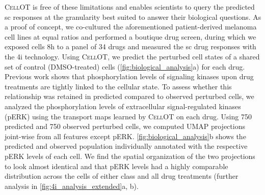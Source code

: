 \textsc{CellOT} is free of these limitations and enables scientists to query the predicted \acrlong{sc} responses at the granularity best suited to answer their biological questions. As a proof of concept, we co-cultured the aforementioned patient-derived melanoma cell lines at equal ratios and performed a boutique drug screen, during which we exposed cells 8h to a panel of 34 drugs and measured the \acrlong{sc} drug responses with the \acrshort{4i} technology. 
Using \textsc{CellOT}, 
we predict the perturbed cell states of a shared set of control (DMSO-treated) cells (\cref{fig:biological_analysis}a) for each drug.
Previous work \citep{kramer2019cellular} shows that phosphorylation levels of signaling kinases upon drug treatments are tightly linked to the cellular state. 
To assess whether this relationship was retained in predicted compared to observed perturbed cells, we analyzed the phosphorylation levels of extracellular signal-regulated kinases (pERK) using the transport maps learned by \textsc{CellOT} on each drug.
Using 750 predicted and 750 observed perturbed cells, we computed \acrshort{UMAP} projections joint-wise from all features except pERK. \cref{fig:biological_analysis}b shows the predicted and observed population individually annotated with the respective pERK levels of each cell. We find the spatial organization of the two projections to look almost identical and that pERK levels had a highly comparable distribution across the cells of either class and all drug treatments (further analysis in \cref{fig:4i_analysis_extended}a, b).


